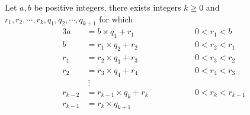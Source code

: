 
\begin{mysubsection}{}
    \noindent Let $a,b$ be positive integers, there exists integers $k\geq 0$ and $r_1, r_2,\cdots,r_k,q_1,q_2,\cdots,q_{k+1}$ for which
    \begin{alignat*}{3}
        a&=b\times q_1 + r_1 &&\qquad \qquad 0<r_1<b\\
        b&=r_1\times q_2 + r_2 &&\qquad \qquad 0<r_2<r_1\\
        r_1&=r_2\times q_3 + r_3 &&\qquad \qquad 0<r_3<r_2\\
        r_2&=r_3\times q_4 + r_4 &&\qquad \qquad 0<r_4<r_3\\
           &\ \vdots&&\\
        r_{k-2}&=r_{k-1}\times q_k + r_k &&\qquad \qquad 0<r_k<r_{k-1}\\
        r_{k-1}&=r_{k}\times q_{k+1}&&
    \end{alignat*}
\end{mysubsection}

\begin{example}[exp:]{}
\end{example}

\begin{shortque}[]{}

\end{shortque}

